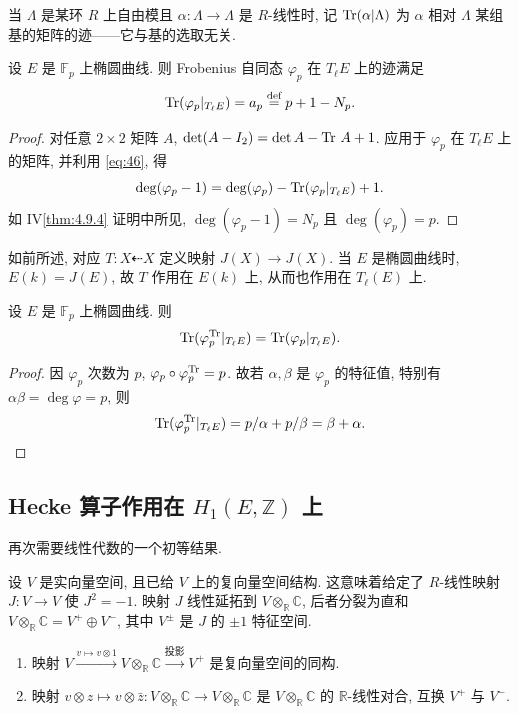 当 $\Lambda$ 是某环 $R$ 上自由模且 $\alpha\colon\Lambda\to\Lambda$ 是 $R$-线性时, 记 $\operatorname{Tr}(\alpha|\Lambda)$ 为 $\alpha$ 相对 $\Lambda$ 某组基的矩阵的迹——它与基的选取无关.

\begin{proposition} \label{thm:5.7.5} 
设 $E$ 是 $\mathbb{F}_p$ 上椭圆曲线. 则 Frobenius 自同态 $\varphi_p$ 在 $T_\ell E$ 上的迹满足
\[
\operatorname{Tr}(\varphi_p|_{T_\ell E}) = a_p \overset{\text{def}}{=} p + 1 - N_p.
\]
\end{proposition}

\begin{proof}
对任意 $2\times 2$ 矩阵 $A$, $\det(A - I_2) = \det A - \operatorname{Tr}\,A + 1$. 应用于 $\varphi_p$ 在 $T_\ell E$ 上的矩阵, 并利用 \eqref{eq:46}, 得
\[
\deg(\varphi_p - 1) = \deg(\varphi_p) - \operatorname{Tr}(\varphi_p|_{T_\ell E}) + 1.
\]
如 IV\ref{thm:4.9.4} 证明中所见, $\deg(\varphi_p - 1) = N_p$ 且 $\deg(\varphi_p) = p$.
\end{proof}

如前所述, 对应 $T\colon X\dashleftarrow X$ 定义映射 $J(X)\to J(X)$. 当 $E$ 是椭圆曲线时, $E(k) = J(E)$, 故 $T$ 作用在 $E(k)$ 上, 从而也作用在 $T_\ell(E)$ 上.

\begin{corollary} \label{thm:5.7.6} 
设 $E$ 是 $\mathbb{F}_p$ 上椭圆曲线. 则
\[
\operatorname{Tr}(\varphi_p^{\operatorname{Tr}}|_{T_\ell E}) = \operatorname{Tr}(\varphi_p|_{T_\ell E}).
\]
\end{corollary}

\begin{proof}
因 $\varphi_p$ 次数为 $p$, $\varphi_p\circ\varphi_p^{\operatorname{Tr}} = p$. 故若 $\alpha, \beta$ 是 $\varphi_p$ 的特征值, 特别有 $\alpha\beta = \deg\varphi = p$, 则
\[
\operatorname{Tr}(\varphi_p^{\operatorname{Tr}}|_{T_\ell E}) = p/\alpha + p/\beta = \beta + \alpha.
\]
\end{proof}

\subsection*{Hecke 算子作用在 $H_1(E, \mathbb{Z})$ 上}

再次需要线性代数的一个初等结果.

设 $V$ 是实向量空间, 且已给 $V$ 上的复向量空间结构. 这意味着给定了 $R$-线性映射 $J\colon V\to V$ 使 $J^2 = -1$. 映射 $J$ 线性延拓到 $V\otimes_{\mathbb{R}}\mathbb{C}$, 后者分裂为直和 $V\otimes_{\mathbb{R}}\mathbb{C} = V^+\oplus V^-$, 其中 $V^{\pm}$ 是 $J$ 的 $\pm 1$ 特征空间.

\begin{proposition} \label{thm:5.7.7} 
\begin{enumerate}[label=\textup{(\alph*)}]
\item 映射 $V\xrightarrow{v\mapsto v\otimes 1}V\otimes_{\mathbb{R}}\mathbb{C}\xrightarrow{\text{投影}}V^+$ 是复向量空间的同构.
\item 映射 $v\otimes z\mapsto v\otimes\bar{z}\colon V\otimes_{\mathbb{R}}\mathbb{C}\to V\otimes_{\mathbb{R}}\mathbb{C}$ 是 $V\otimes_{\mathbb{R}}\mathbb{C}$ 的 $\mathbb{R}$-线性对合, 互换 $V^+$ 与 $V^-$.
\end{enumerate}
\end{proposition}


